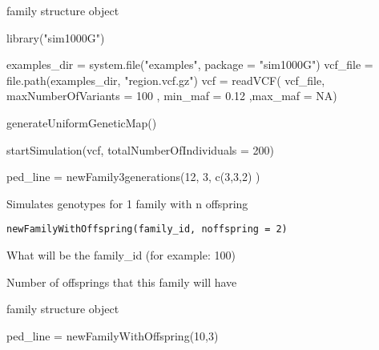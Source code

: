 \documentclass[letterpaper]{book}
\begin{document}
%
\begin{Value}
family structure object
\end{Value}
%
\begin{Examples}
\begin{ExampleCode}

library("sim1000G")

examples_dir = system.file("examples", package = "sim1000G")
vcf_file = file.path(examples_dir, "region.vcf.gz")
vcf = readVCF( vcf_file, maxNumberOfVariants = 100 ,
               min_maf = 0.12 ,max_maf = NA)

generateUniformGeneticMap()

startSimulation(vcf, totalNumberOfIndividuals = 200)

ped_line = newFamily3generations(12, 3, c(3,3,2) )

\end{ExampleCode}
\end{Examples}
%
\begin{Description}\relax
Simulates genotypes for 1 family with n offspring
\end{Description}
%
\begin{Usage}
\begin{verbatim}
newFamilyWithOffspring(family_id, noffspring = 2)
\end{verbatim}
\end{Usage}
%
\begin{Arguments}
\begin{ldescription}
\item[\code{family\_id}] What will be the family\_id (for example: 100)

\item[\code{noffspring}] Number of offsprings that this family will have
\end{ldescription}
\end{Arguments}
%
\begin{Value}
family structure object
\end{Value}
%
\begin{Examples}
\begin{ExampleCode}

ped_line = newFamilyWithOffspring(10,3)


\end{ExampleCode}
\end{Examples}
\end{document}
